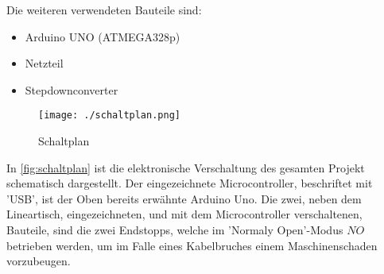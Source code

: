 Die weiteren verwendeten Bauteile sind:
\begin{itemize}
    \item Arduino UNO (ATMEGA328p)
    \item Netzteil
    \item Stepdownconverter
\end{itemize}

\begin{figure}[H]
    \centering
    \texttt{[image: ./schaltplan.png]}
    \caption{Schaltplan}
    \label{fig:schaltplan}
\end{figure}

In \autoref{fig:schaltplan} ist die elektronische Verschaltung des gesamten Projekt schematisch dargestellt. Der eingezeichnete Microcontroller, beschriftet mit 'USB', ist der Oben bereits erwähnte Arduino Uno. Die zwei, neben dem Lineartisch, eingezeichneten, und mit dem Microcontroller verschaltenen, Bauteile, sind die zwei Endstopps, welche im 'Normaly Open'-Modus $NO$ betrieben werden, um im Falle eines Kabelbruches einem Maschinenschaden vorzubeugen.